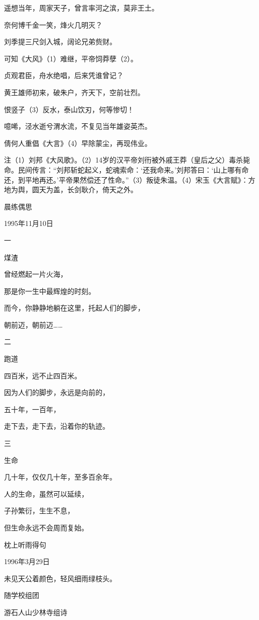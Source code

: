 \documentclass[../../dazhuan.tex]{subfiles}
\begin{document}
遥想当年，周家天子，曾言率河之滨，莫非王土。

奈何博千金一笑，烽火几明灭？

刘季提三尺剑入城，阔论兄弟赀财。

可知《大风》（1）难继，平帝饲莽孽（2）。

贞观君臣，舟水绝唱，后来凭谁曾记？

黄王雄师初来，破朱户，齐天下，空前壮烈。

恨竖子（3）反水，泰山饮刃，何等惨切！

噫唏，泾水逝兮渭水流，不复见当年雄姿英杰。

倩何人重倡《大言》（4）早除蒙尘，再现伟业。

注（1）刘邦《大风歌》。（2）14岁的汉平帝刘衎被外戚王莽（皇后之父）毒杀毙命。民间传言：“刘邦斩蛇起义，蛇魂索命：‘还我命来。’刘邦答曰：‘山上哪有命还，到平地再还。’平帝果然偿还了性命。”（3）叛徒朱温。（4）宋玉《大言赋》：方地为舆，圆天为盖，长剑耿介，倚天之外。



晨练偶思

1995年11月10日

一

煤渣

曾经燃起一片火海，

那是你一生中最辉煌的时刻。

而今，你静静地躺在这里，托起人们的脚步，

朝前迈，朝前迈……

二

跑道

四百米，远不止四百米。

因为人们的脚步，永远是向前的，

五十年，一百年，

走下去，走下去，沿着你的轨迹。

三

生命

几十年，仅仅几十年，至多百余年。

人的生命，虽然可以延续，

子孙繁衍，生生不息，

但生命永远不会周而复始。



枕上听雨得句

1996年3月29日

未见天公着颜色，轻风细雨绿枝头。



随学校组团

游石人山少林寺组诗
\end{document}
